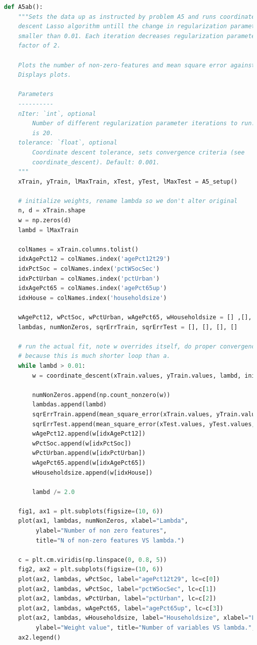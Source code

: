 \documentclass{article}
\newcommand{\1}{\mathbf{1}}
\begin{document}
\begin{enumerate}
\begin{lstlisting}[language=Python]
def A5ab():
    """Sets the data up as instructed by problem A5 and runs coordinate
    descent Lasso algorithm untill the change in regularization parameter is
    smaller than 0.01. Each iteration decreases regularization parameter by a
    factor of 2.

    Plots the number of non-zero-features and mean square error against lambda.
    Displays plots.

    Parameters
    ----------
    nIter: `int`, optional
        Number of different regularization parameter iterations to run. Default
        is 20.
    tolerance: `float`, optional
        Coordinate descent tolerance, sets convergence criteria (see
        coordinate_descent). Default: 0.001.
    """
    xTrain, yTrain, lMaxTrain, xTest, yTest, lMaxTest = A5_setup()

    # initialize weights, rename lambda so we don't alter original
    n, d = xTrain.shape
    w = np.zeros(d)
    lambd = lMaxTrain

    colNames = xTrain.columns.tolist()
    idxAgePct12 = colNames.index('agePct12t29')
    idxPctSoc = colNames.index('pctWSocSec')
    idxPctUrban = colNames.index('pctUrban')
    idxAgePct65 = colNames.index('agePct65up')
    idxHouse = colNames.index('householdsize')

    wAgePct12, wPctSoc, wPctUrban, wAgePct65, wHouseholdsize = [] ,[], [], [], []
    lambdas, numNonZeros, sqrErrTrain, sqrErrTest = [], [], [], []

    # run the actual fit, note w overrides itself, do proper convergence
    # because this is much shorter loop than a.
    while lambd > 0.01:
        w = coordinate_descent(xTrain.values, yTrain.values, lambd, initW=w, convergeFast=False)

        numNonZeros.append(np.count_nonzero(w))
        lambdas.append(lambd)
        sqrErrTrain.append(mean_square_error(xTrain.values, yTrain.values, w))
        sqrErrTest.append(mean_square_error(xTest.values, yTest.values, w))
        wAgePct12.append(w[idxAgePct12])    
        wPctSoc.append(w[idxPctSoc])
        wPctUrban.append(w[idxPctUrban])
        wAgePct65.append(w[idxAgePct65])
        wHouseholdsize.append(w[idxHouse])

        lambd /= 2.0

    fig1, ax1 = plt.subplots(figsize=(10, 6))
    plot(ax1, lambdas, numNonZeros, xlabel="Lambda",
         ylabel="Number of non zero features",
         title="N of non-zero features VS lambda.")

    c = plt.cm.viridis(np.linspace(0, 0.8, 5))
    fig2, ax2 = plt.subplots(figsize=(10, 6))
    plot(ax2, lambdas, wPctSoc, label="agePct12t29", lc=c[0])
    plot(ax2, lambdas, wPctSoc, label="pctWSocSec", lc=c[1])
    plot(ax2, lambdas, wPctUrban, label="pctUrban", lc=c[2])
    plot(ax2, lambdas, wAgePct65, label="agePct65up", lc=c[3])
    plot(ax2, lambdas, wHouseholdsize, label="Householdsize", xlabel="Lambda",
         ylabel="Weight value", title="Number of variables VS lambda.", lc=c[4])
    ax2.legend()
    

\end{lstlisting}
\end{enumerate}
\end{document}
